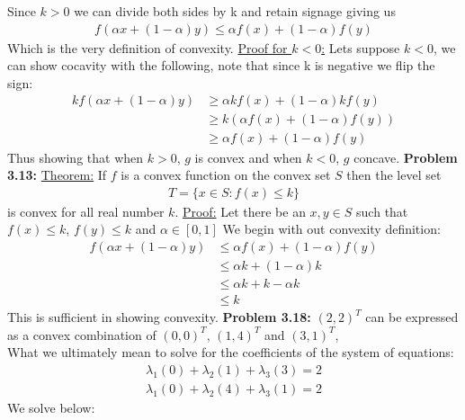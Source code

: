 \documentclass{article}
\begin{document}
Since $k > 0$ we can divide both sides by k and retain signage giving us
\begin{align*} 
    f(\alpha x + (1 - \alpha)y) \leq \alpha f(x) + (1 - \alpha)f(y)
\end{align*}
Which is the very definition of convexity. \newline
\underline{Proof for $k < 0$:} Lets suppose $k < 0$, we can show cocavity with the following, note that since k is negative we flip the sign:
\begin{align*}
    kf(\alpha x + (1 - \alpha)y) & \geq \alpha kf(x) + (1 - \alpha)kf(y) \\
    & \geq k(\alpha f(x) + (1 - \alpha)f(y)) \\
    & \geq \alpha f(x) + (1 - \alpha)f(y)
\end{align*}
Thus showing that when $k > 0$, $g$ is convex and when $k < 0$, $g$ concave.
\break
\break
\textbf{Problem 3.13:} \underline{Theorem:} If $f$ is a convex function on the convex set $S$ then the level set
\begin{align*}
    T = \{ x \in S : f(x) \leq k \}
\end{align*}
is convex for all real number $k$. \newline
\underline{Proof:} Let there be an $x,y \in S$ such that $f(x) \leq k$, $f(y) \leq k$ and $\alpha \in [0,1]$ We begin with out convexity definition:
\begin{align*}
    f(\alpha x + (1 - \alpha)y) & \leq \alpha f(x) + (1 - \alpha)f(y) \\
    & \leq \alpha k + (1 - \alpha)k \\
    & \leq \alpha k + k - \alpha k \\
    & \leq k
\end{align*}
This is sufficient in showing convexity.
\newline
\break
\textbf{Problem 3.18:} $(2,2)^T$ can be expressed as a convex combination of $(0, 0)^T$, $(1,4)^T$ and $(3,1)^T$, \\
What we ultimately mean to solve for the coefficients of the system of equations:
\begin{align*}
    \lambda_1(0) + \lambda_2(1) + \lambda_3(3) = 2 \\
    \lambda_1(0) + \lambda_2(4) + \lambda_3(1) = 2
\end{align*}
We solve below:
\end{document}
